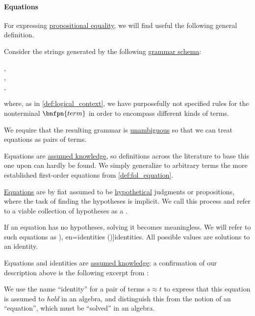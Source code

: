 \paragraph{Equations}

\begin{definition}\label{def:equation}\mimprovised
  For expressing \hyperref[con:equality]{propositional equality}, we will find useful the following general definition.

  Consider the strings generated by the following \hyperref[def:formal_grammar/schema]{grammar schema}:
  \begin{bnf*}
      {}, \\
     {}, \\
       { \bnfsp \bnftsq{\( \syneq \)} \bnfsp {}},
  \end{bnf*}
  where, as in \cref{def:logical_context}, we have purposefully not specified rules for the nonterminal \( \bnfpn{term} \) in order to encompass different kinds of terms.

  We require that the resulting grammar is \hyperref[def:grammar_ambiguity]{unambiguous} so that we can treat equations as pairs of terms.
\end{definition}
\begin{comments}
  \item Equations are \hyperref[con:assumed_knowledge]{assumed knowledge}, so definitions across the literature to base this one upon can hardly be found. We simply generalize to arbitrary terms the more established first-order equations from \cref{def:fol_equation}.
\end{comments}

\begin{concept}\label{con:equation_solution}
  \hyperref[def:equation]{Equations} are by fiat assumed to be \hyperref[con:hypothetical_judgment]{hypothetical} judgments or propositions, where the task of finding the hypotheses is implicit. We call this process  and refer to a viable collection of hypotheses as a .

  If an equation has no hypotheses, solving it becomes meaningless. We will refer to such equations as \term[bg=тъждества (\cite[2]{Обрешков1962ВисшаАлгебра}), en=identities (\cite[50]{BaaderNipkow2012TermRewriting})]{identities}. All possible values are solutions to an identity.
\end{concept}
\begin{comments}
  \item Equations and identities are \hyperref[con:assumed_knowledge]{assumed knowledge}; a confirmation of our description above is the following excerpt from \cite[50]{BaaderNipkow2012TermRewriting}:
  \begin{displayquote}
    We use the name \enquote{identity} for a pair of terms \( s \approx t \) to express that this equation is assumed to \textit{hold} in an algebra, and distinguish this from the notion of an \enquote{equation}, which must be \enquote{solved} in an algebra.
  \end{displayquote}
\end{comments}

